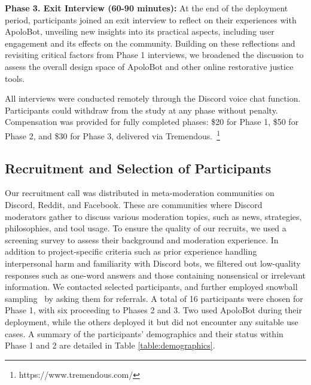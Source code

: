 \textbf{Phase 3. Exit Interview (60-90 minutes):} At the end of the deployment period, participants joined an exit interview to reflect on their experiences with ApoloBot, unveiling new insights into its practical aspects, including user engagement and its effects on the community. Building on these reflections and revisiting critical factors from Phase 1 interviews, we  broadened the discussion to assess the overall design space of ApoloBot and other online restorative justice tools.

All interviews were conducted remotely through the Discord voice chat function. Participants could withdraw from the study at any phase without penalty. Compensation was provided for fully completed phases: \$20 for Phase 1, \$50 for Phase 2, and \$30 for Phase 3, delivered via Tremendous.~\footnote{https://www.tremendous.com/}


\subsection{Recruitment and Selection of Participants}
Our recruitment call was distributed in meta-moderation communities on Discord, Reddit, and Facebook. These are communities where Discord moderators gather to discuss various moderation topics, such as news, strategies, philosophies, and tool usage. To ensure the quality of our recruits, we used a screening survey to assess their background and moderation experience. In addition to project-specific criteria such as prior experience handling interpersonal harm and familiarity with Discord bots, we filtered out low-quality responses such as one-word answers and those containing nonsensical or irrelevant information. We contacted selected participants, and further employed snowball sampling~\cite{Biernacki1981} by asking them for referrals. A total of 16 participants were chosen for Phase 1, with six proceeding to Phases 2 and 3. Two used ApoloBot during their deployment, while the others deployed it but did not encounter any suitable use cases. A summary of the participants' demographics and their status within Phase 1 and 2 are detailed in Table \ref{table:demographics}.


